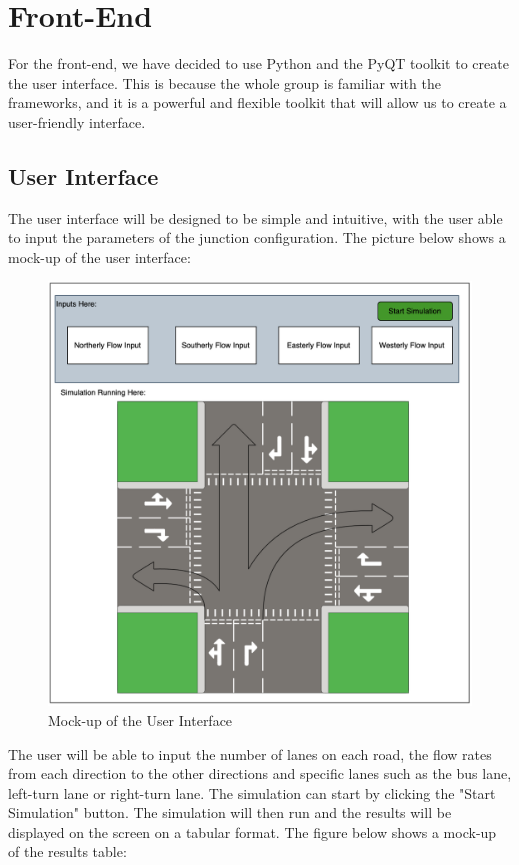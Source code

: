 \documentclass{article}
\begin{document}
\section{Front-End}
For the front-end, we have decided to use Python and the PyQT toolkit to create the user interface. This is because the whole group is familiar 
with the frameworks, and it is a powerful and flexible toolkit that will allow us to create a user-friendly interface.

\subsection{User Interface}
The user interface will be designed to be simple and intuitive, with the user able to input the parameters of the junction configuration.
The picture below shows a mock-up of the user interface:

\begin{figure}[H]
    \centering
    \includegraphics[width=\textwidth]{frontendui.png}
    \caption{Mock-up of the User Interface}
    \label{frontendUI}
\end{figure}

The user will be able to input the number of lanes on each road, the flow rates from each direction to the other directions and specific lanes such
as the bus lane, left-turn lane or right-turn lane. The simulation can start by clicking the "Start Simulation" button. The simulation will then run and the results will be displayed on the screen on a tabular format.
The figure below shows a mock-up of the results table:
\end{document}
